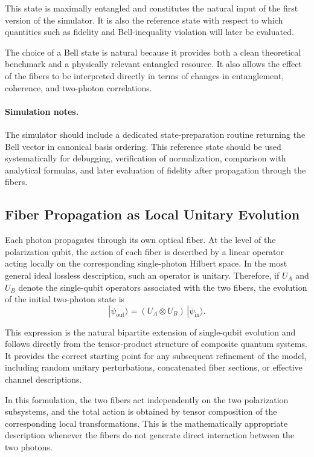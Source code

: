 \documentclass[a4paper]{article}
\begin{document}
This state is maximally entangled and constitutes the natural input of the first version of the simulator. It is also the reference state with respect to which quantities such as fidelity and Bell-inequality violation will later be evaluated.

The choice of a Bell state is natural because it provides both a clean theoretical benchmark and a physically relevant entangled resource. It also allows the effect of the fibers to be interpreted directly in terms of changes in entanglement, coherence, and two-photon correlations.

\paragraph{Simulation notes.}
The simulator should include a dedicated state-preparation routine returning the Bell vector in canonical basis ordering. This reference state should be used systematically for debugging, verification of normalization, comparison with analytical formulas, and later evaluation of fidelity after propagation through the fibers.

\subsection{Fiber Propagation as Local Unitary Evolution}

Each photon propagates through its own optical fiber. At the level of the polarization qubit, the action of each fiber is described by a linear operator acting locally on the corresponding single-photon Hilbert space. In the most general ideal lossless description, such an operator is unitary. Therefore, if \(U_A\) and \(U_B\) denote the single-qubit operators associated with the two fibers, the evolution of the initial two-photon state is
\[
|\psi_{\mathrm{out}}\rangle
=
(U_A \otimes U_B)\, |\psi_{\mathrm{in}}\rangle.
\]

This expression is the natural bipartite extension of single-qubit evolution and follows directly from the tensor-product structure of composite quantum systems. It provides the correct starting point for any subsequent refinement of the model, including random unitary perturbations, concatenated fiber sections, or effective channel descriptions.

In this formulation, the two fibers act independently on the two polarization subsystems, and the total action is obtained by tensor composition of the corresponding local transformations. This is the mathematically appropriate description whenever the fibers do not generate direct interaction between the two photons.
\end{document}
